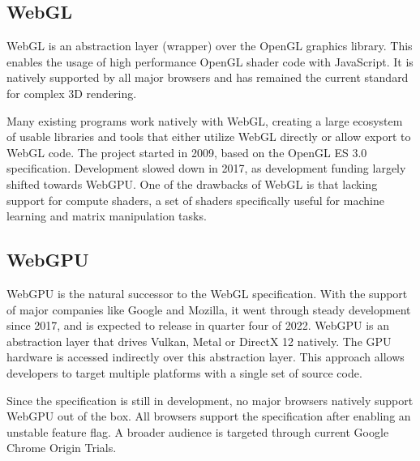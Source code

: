 \subsection{WebGL}
WebGL is an abstraction layer (wrapper) over the OpenGL graphics library.
This enables the usage of high performance OpenGL shader code with JavaScript.
It is natively supported by all major browsers and has remained the current standard for
complex 3D rendering.

Many existing programs work natively with WebGL, creating a large ecosystem of usable libraries
and tools that either utilize WebGL directly or allow export to WebGL code.
The project started in 2009, based on the OpenGL ES 3.0 specification.
Development slowed down in 2017, as development funding largely shifted towards WebGPU.
One of the drawbacks of WebGL is that lacking support for compute shaders, a set of shaders
specifically useful for machine learning and matrix manipulation tasks.

\subsection{WebGPU}
WebGPU is the natural successor to the WebGL specification.
With the support of major companies like Google and Mozilla, it went through steady
development since 2017, and is expected to release in quarter four of 2022.
WebGPU is an abstraction layer that drives Vulkan, Metal or DirectX 12 natively.
The GPU hardware is accessed indirectly over this abstraction layer.
This approach allows developers to target multiple platforms with a single set of source code.

Since the specification is still in development, no major browsers natively support WebGPU
out of the box. All browsers support the specification after enabling an unstable feature flag.
A broader audience is targeted through current Google Chrome Origin Trials.


